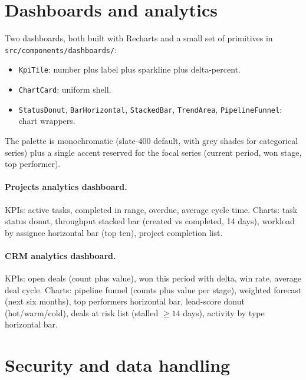 \documentclass[11pt,a4paper,oneside]{article}
\newcommand{\code}[1]{\texttt{\small #1}}
\begin{document}
\section{Dashboards and analytics}\label{sec:dashboards}

Two dashboards, both built with Recharts and a small set of
primitives in \code{src/components/dashboards/}:

\begin{itemize}
  \item \code{KpiTile}: number plus label plus sparkline plus
    delta-percent.
  \item \code{ChartCard}: uniform shell.
  \item \code{StatusDonut}, \code{BarHorizontal}, \code{StackedBar},
    \code{TrendArea}, \code{PipelineFunnel}: chart wrappers.
\end{itemize}

The palette is monochromatic (slate-400 default, with grey shades for
categorical series) plus a single accent reserved for the focal
series (current period, won stage, top performer).

\paragraph{Projects analytics dashboard.}
KPIs: active tasks, completed in range, overdue, average cycle time.
Charts: task status donut, throughput stacked bar (created vs
completed, 14 days), workload by assignee horizontal bar (top ten),
project completion list.

\paragraph{CRM analytics dashboard.}
KPIs: open deals (count plus value), won this period with delta,
win rate, average deal cycle. Charts: pipeline funnel (counts plus
value per stage), weighted forecast (next six months), top performers
horizontal bar, lead-score donut (hot/warm/cold), deals at risk list
(stalled $\geq 14$ days), activity by type horizontal bar.

\section{Security and data handling}\label{sec:security}
\end{document}
